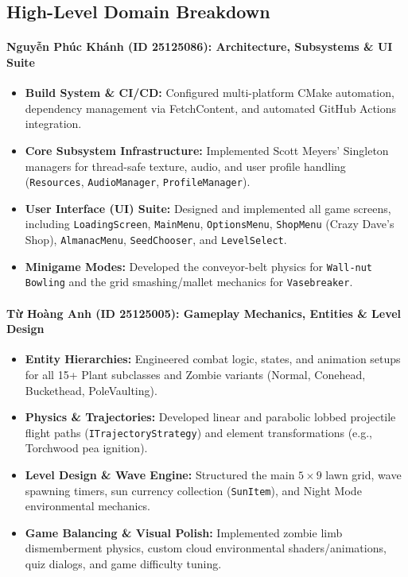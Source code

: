 \documentclass[12pt,a4paper]{article}
\begin{document}
\subsection{High-Level Domain Breakdown}

\paragraph{Nguyễn Phúc Khánh (ID 25125086): Architecture, Subsystems \& UI Suite}
\begin{itemize}
    \item \textbf{Build System \& CI/CD:} Configured multi-platform CMake automation, dependency management via FetchContent, and automated GitHub Actions integration.
    \item \textbf{Core Subsystem Infrastructure:} Implemented Scott Meyers' Singleton managers for thread-safe texture, audio, and user profile handling (\texttt{Resources}, \texttt{AudioManager}, \texttt{ProfileManager}).
    \item \textbf{User Interface (UI) Suite:} Designed and implemented all game screens, including \texttt{LoadingScreen}, \texttt{MainMenu}, \texttt{OptionsMenu}, \texttt{ShopMenu} (Crazy Dave's Shop), \texttt{AlmanacMenu}, \texttt{SeedChooser}, and \texttt{LevelSelect}.
    \item \textbf{Minigame Modes:} Developed the conveyor-belt physics for \texttt{Wall-nut Bowling} and the grid smashing/mallet mechanics for \texttt{Vasebreaker}.
\end{itemize}

\paragraph{Từ Hoàng Anh (ID 25125005): Gameplay Mechanics, Entities \& Level Design}
\begin{itemize}
    \item \textbf{Entity Hierarchies:} Engineered combat logic, states, and animation setups for all 15+ Plant subclasses and Zombie variants (Normal, Conehead, Buckethead, PoleVaulting).
    \item \textbf{Physics \& Trajectories:} Developed linear and parabolic lobbed projectile flight paths (\texttt{ITrajectoryStrategy}) and element transformations (e.g., Torchwood pea ignition).
    \item \textbf{Level Design \& Wave Engine:} Structured the main $5 \times 9$ lawn grid, wave spawning timers, sun currency collection (\texttt{SunItem}), and Night Mode environmental mechanics.
    \item \textbf{Game Balancing \& Visual Polish:} Implemented zombie limb dismemberment physics, custom cloud environmental shaders/animations, quiz dialogs, and game difficulty tuning.
\end{itemize}
\end{document}
